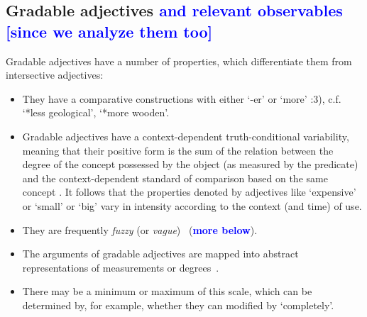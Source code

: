 \documentclass[11pt]{article}
\begin{document}
\subsection{Gradable adjectives \textcolor{blue}{and relevant observables [since we analyze them too]}}

Gradable adjectives have a number of properties, which differentiate them
from intersective adjectives:

\begin{itemize}
\item They have a comparative constructions with either `-er' or `more' \cite{kennedy1999scalar}:3), c.f. `*less geological', `*more wooden'.
\item Gradable adjectives have a context-dependent truth-conditional variability, meaning that their positive form is the sum of the relation between the degree of the concept possessed by the object (as measured by the predicate) and the context-dependent standard of comparison based on the same concept \cite{kennedy2007vagueness}. It follows that the properties denoted by adjectives like `expensive' or `small' or `big' vary in intensity according to the context (and time) of use. 
\item They are frequently \emph{fuzzy} (or \emph{vague})~\cite{kennedy2007vagueness} (\textbf{\textcolor{blue}{more below}}).
\item The arguments of gradable adjectives are mapped into abstract representations of measurements or degrees~\cite{kennedy2007vagueness}.
\item There may be a minimum or maximum of this scale, which can be determined
by, for example, whether they can modified by `completely'.
\end{itemize}
\end{document}
